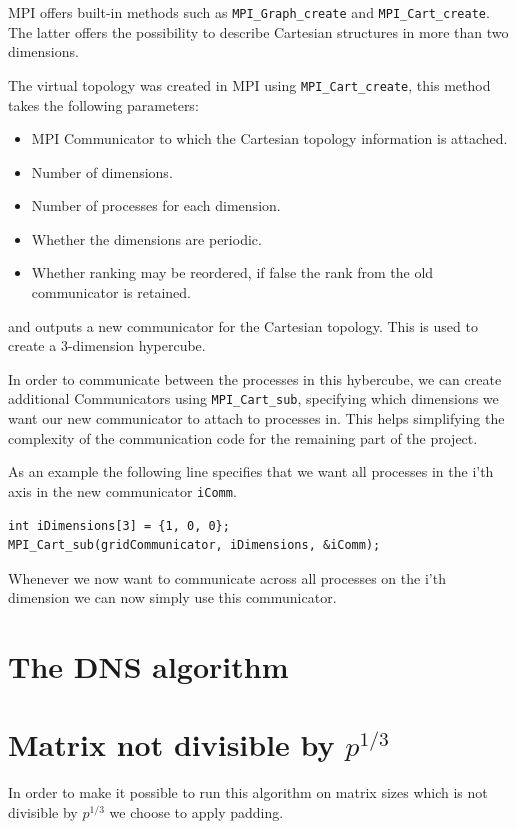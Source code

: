 \documentclass[a4paper,11pt,oneside]{book}
\begin{document}
MPI offers built-in methods such as \verb!MPI_Graph_create! and \verb!MPI_Cart_create!. The latter offers the possibility to describe Cartesian structures in more than two dimensions.

The virtual topology was created in MPI using \verb!MPI_Cart_create!, this method takes the following parameters:
\begin{itemize}
\item MPI Communicator to which the Cartesian topology information is attached.
\item Number of dimensions.
\item Number of processes for each dimension.
\item Whether the dimensions are periodic.
\item Whether ranking may be reordered, if false the rank from the old communicator is retained.
\end{itemize}
and outputs a new communicator for the Cartesian topology. This is used to create a 3-dimension hypercube.

In order to communicate between the processes in this hybercube, we can create additional Communicators using \verb!MPI_Cart_sub!, specifying which dimensions we want our new communicator to attach to processes in. This helps simplifying the complexity of the communication code for the remaining part of the project.

As an example the following line specifies that we want all processes in the i'th axis in the new communicator \verb!iComm!.

\begin{verbatim}
int iDimensions[3] = {1, 0, 0};
MPI_Cart_sub(gridCommunicator, iDimensions, &iComm);
\end{verbatim}

Whenever we now want to communicate across all processes on the i'th dimension we can now simply use this communicator.

\section{The DNS algorithm}

\section{Matrix not divisible by $p^{1/3}$}
In order to make it possible to run this algorithm on matrix sizes which is not divisible by $p^{1/3}$ we choose to apply padding.
\end{document}
